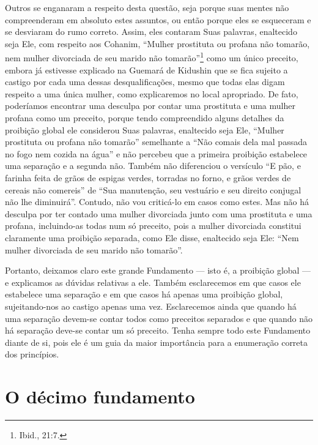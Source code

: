 Outros se enganaram a respeito desta questão, seja porque suas mentes
não compreenderam em absoluto estes assuntos, ou então porque eles se
esqueceram e se desviaram do rumo correto. Assim, eles contaram Suas
palavras, enaltecido seja Ele, com respeito aos Cohanim, ``Mulher
prostituta ou profana não tomarão, nem mulher divorciada de seu marido
não tomarão''\footnote{Ibid., 21:7.} como um único preceito, embora já estivesse
explicado na Guemará de Kidushin que se fica sujeito a castigo por cada
uma dessas desqualificações, mesmo que todas elas digam respeito a uma
única mulher, como explicaremos no local apropriado. De fato, poderíamos
encontrar uma desculpa por contar uma
prostituta e uma mulher profana como um preceito, porque tendo
compreendido alguns detalhes da proibição global ele considerou Suas
palavras, enaltecido seja Ele, ``Mulher prostituta ou profana não
tomarão'' semelhante a ``Não comais dela mal passada no fogo nem cozida
na água'' e não percebeu que a primeira proibição estabelece uma
separação e a segunda não. Também não diferenciou o versículo ``E pão,
e farinha feita de grãos de espigas verdes, torradas no forno, e grãos
verdes de cereais não comereis'' de ``Sua manutenção, seu vestuário e
seu direito conjugal não lhe diminuirá''. Contudo, não vou criticá-lo
em casos como estes. Mas não há desculpa por ter contado uma mulher
divorciada junto com uma prostituta e uma profana, incluindo-as todas
num só preceito, pois a mulher divorciada constitui claramente uma
proibição separada, como Ele disse, enaltecido seja Ele: ``Nem mulher
divorciada de seu marido não tomarão''.

Portanto, deixamos claro este grande Fundamento --- isto é, a proibição
global --- e explicamos as dúvidas relativas a ele. Também esclarecemos
em que casos ele estabelece uma separação e em que casos há apenas uma
proibição global, sujeitando-nos ao castigo apenas uma vez.
Esclarecemos ainda que quando há uma separação devem-se contar todos
como preceitos separados e que quando não há separação deve-se contar um
só preceito. Tenha sempre todo este Fundamento diante de si, pois ele é
um guia da maior importância para a enumeração correta dos princípios.

\chapter*{O décimo fundamento}

